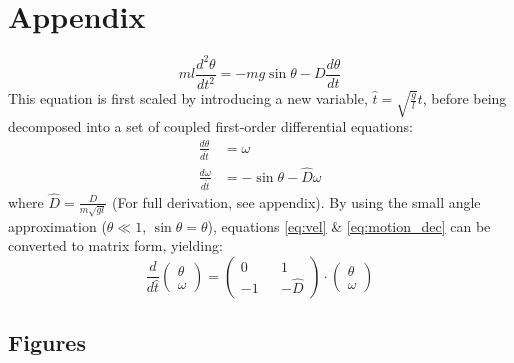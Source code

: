 \documentclass[a4paper,11pt]{article}
\begin{document}
	
	{}
	
	\pagebreak
	\appendix
	\section{Appendix}
	\begin{equation}
	ml\frac{d^2\theta}{dt^2}=-mg\sin\theta-D\frac{d\theta}{dt}
	\end{equation}
	This equation is first scaled by introducing a new variable, $\hat{t}=\sqrt{\frac{g}{l}}t$, before being decomposed into a set of coupled first-order differential equations:
	\begin{align}
	\frac{d\theta}{d\hat{t}}&=\omega\label{eq:vel}\\
	\frac{d\omega}{d\hat{t}}&=-\sin\theta-\hat{D}\omega\label{eq:motion_dec}
	\end{align}
	where $\hat{D} = \frac{D}{m\sqrt{gl}}$ (For full derivation, see appendix). By using the small angle approximation ($\theta\ll1$, $\sin\theta=\theta$), equations \ref{eq:vel} \& \ref{eq:motion_dec} can be converted to matrix form, yielding:
	\begin{equation}
	\frac{d}{d\hat{t}}\begin{pmatrix}\theta\\\omega\end{pmatrix} = \begin{pmatrix}0&&1\\-1&&-\hat{D}\end{pmatrix} \cdot\begin{pmatrix}\theta\\\omega\end{pmatrix}
	\end{equation}
	\subsection{Figures}
\end{document}
